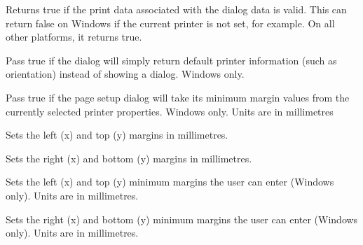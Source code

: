 
Returns true if the print data associated with the dialog data is valid.
This can return false on Windows if the current printer is not set, for example.
On all other platforms, it returns true.

\label{wxpagesetupdialogdatasetdefaultinfo}


Pass true if the dialog will simply return default printer information (such as orientation)
instead of showing a dialog. Windows only.

\label{wxpagesetupdialogdatasetdefaultminmargins}


Pass true if the page setup dialog will take its minimum margin values from the currently
selected printer properties. Windows only. Units are in millimetres

\label{wxpagesetupdialogdatasetmargintopleft}


Sets the left (x) and top (y) margins in millimetres.

\label{wxpagesetupdialogdatasetmarginbottomright}


Sets the right (x) and bottom (y) margins in millimetres.

\label{wxpagesetupdialogdatasetminmargintopleft}


Sets the left (x) and top (y) minimum margins the user can enter (Windows only). Units are
in millimetres.

\label{wxpagesetupdialogdatasetminmarginbottomright}


Sets the right (x) and bottom (y) minimum margins the user can enter (Windows only). Units are
in millimetres.


